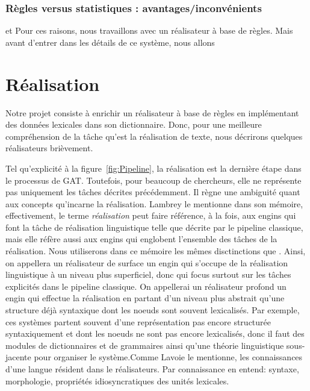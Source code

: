 \subsubsection{Règles versus statistiques : avantages/inconvénients}
\citep{BelzSystemBuildingCost2009} et \citep{Vicentegeneracionlenguajenatural2015}
Pour ces raisons, nous travaillons avec un réalisateur à base de règles. Mais avant d'entrer dans les détails de ce système, nous allons 

\section{Réalisation}

Notre projet consiste à enrichir un réalisateur à base de règles en implémentant des données lexicales dans son dictionnaire. Donc, pour une meilleure compréhension de la tâche qu'est la réalisation de texte, nous décrirons quelques réalisateurs brièvement. 

Tel qu'explicité à la figure~\ref{fig:Pipeline}, la réalisation est la dernière étape dans le processus de \ac{GAT}. Toutefois, pour beaucoup de chercheurs, elle ne représente pas uniquement les tâches décrites précédemment. Il règne une ambiguité quant aux concepts qu'incarne la réalisation. Lambrey le mentionne \citep{LambreyImplementationcollocationspour2017} dans son mémoire, effectivement, le terme \emph{réalisation} peut faire référence, à la fois, aux engins qui font la tâche de réalisation linguistique telle que décrite par le pipeline classique, mais elle réfère aussi aux engins qui englobent l'ensemble des tâches de la réalisation. Nous utiliserons dans ce mémoire les mêmes disctinctions que \citep{LambreyImplementationcollocationspour2017}. Ainsi, on appellera un réalisateur de surface un engin qui s'occupe de la réalisation linguistique à un niveau plus superficiel, donc qui focus surtout sur les tâches explicités dans le pipeline classique. On appellerai un réalisateur profond un engin qui effectue la réalisation en partant d'un niveau plus abstrait qu'une structure déjà syntaxique dont les noeuds sont souvent lexicalisés. Par exemple, ces systèmes partent souvent d'une représentation pas encore structurée syntaxiquement et dont les noeuds ne sont pas encore lexicalisés, donc il faut des modules de dictionnaires et de grammaires ainsi qu'une théorie linguistique sous-jacente pour organiser le système.Comme Lavoie le mentionne\citep{LavoieFastPortableRealizer1997}, les connaissances d'une langue résident dans le réalisateurs. Par connaissance en entend: syntaxe, morphologie, propriétés idiosyncratiques des unités lexicales. 

